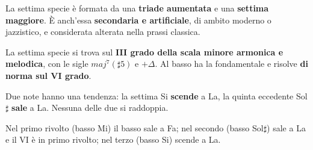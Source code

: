 La settima specie è formata da una \textbf{triade aumentata} e una \textbf{settima maggiore}. È anch'essa \textbf{secondaria e artificiale}, di ambito moderno o jazzistico, e considerata alterata nella prassi classica.

\begin{regola}
	\label{reg:settima_specie}
	La settima specie si trova sul \textbf{III grado della scala minore armonica e melodica}, con le sigle $maj^7(\sharp5)$ e $+\Delta$. Al basso ha la fondamentale e risolve \textbf{di norma sul VI grado}.
\end{regola}

Due note hanno una tendenza: la settima Si \textbf{scende} a La, la quinta eccedente Sol$\sharp$ \textbf{sale} a La. Nessuna delle due si raddoppia.

\begin{esempio}
	\label{ex:settima_specie}
	Nel primo rivolto (basso Mi) il basso sale a Fa; nel secondo (basso Sol$\sharp$) sale a La e il VI è in primo rivolto; nel terzo (basso Si) scende a La.
\end{esempio}
